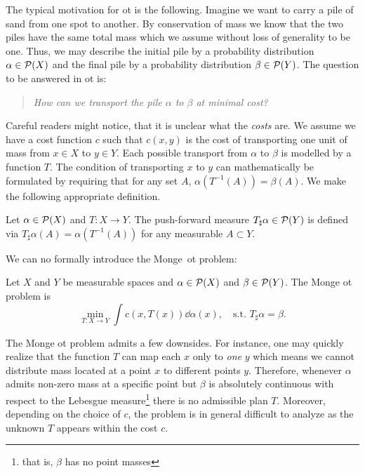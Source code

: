 The typical motivation for \gls{ot} is the following. Imagine we want to carry a pile of sand from one spot to another. By conservation of mass we know that the two piles have the same total mass which we assume without loss of generality to be one. Thus, we may describe the initial pile by a probability distribution $\alpha\in\mathcal{P}(X)$ and the final pile by a probability distribution $\beta\in\mathcal{P}(Y)$. The question to be answered in \gls{ot} is:
\begin{quote}
    \centering
    \emph{How can we transport the pile $\alpha$ to $\beta$ at minimal cost?}
\end{quote}
Careful readers might notice, that it is unclear what the \emph{costs} are. We assume we have a cost function $c$ such that $c(x,y)$ is the cost of transporting one unit of mass from $x\in X$ to $y\in Y$. Each possible transport from $\alpha$ to $\beta$ is modelled by a function $T$. The condition of transporting $x$ to $y$ can mathematically be formulated by requiring that for any set $A$, $\alpha(T^{-1}(A)) = \beta(A)$. We make the following appropriate definition.
\begin{defn}
    Let $\alpha\in \mathcal{P}(X)$ and $T:X\rightarrow Y$. The push-forward measure $T_\sharp\alpha\in \mathcal{P}(Y)$ is defined via $T_\sharp \alpha(A) = \alpha(T^{-1}(A))$ for any measurable $A\subset Y$.
\end{defn}

We can no formally introduce the Monge~\gls{ot} problem:
\begin{defn}
    Let $X$ and $Y$ be measurable spaces and $\alpha\in \mathcal{P}(X)$ and $\beta\in \mathcal{P}(Y)$. The Monge \gls{ot} problem is 
    \begin{equation}\label{ot:eq:monge}
        \min_{T:X\rightarrow Y} \int c(x,T(x))\dd \alpha(x),\quad\text{s.t. }T_\sharp\alpha = \beta.
    \end{equation}
\end{defn}
The Monge \gls{ot} problem admits a few downsides. For instance, one may quickly realize that the function $T$ can map each $x$ only to \emph{one} $y$ which means we cannot distribute mass located at a point $x$ to different points $y$. Therefore, whenever $\alpha$ admits non-zero mass at a specific point but $\beta$ is absolutely continuous with respect to the Lebesgue measure\footnote{that is, $\beta$ has no point masses} there is no admissible plan $T$. Moreover, depending on the choice of $c$, the problem is in general difficult to analyze as the unknown $T$ appears within the cost $c$. 

